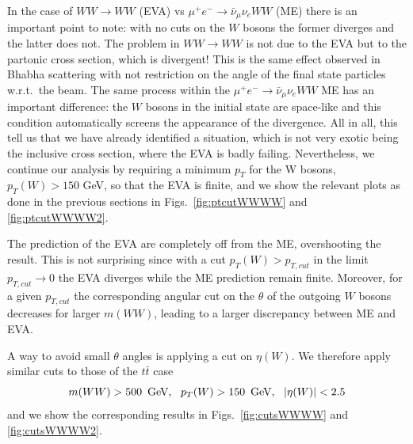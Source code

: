 \documentclass[a4paper,11pt]{article}
\begin{document}
In the case of $WW \to WW$ (EVA) vs $\mu^+e^-\to\bar \nu_\mu \nu_e WW$ (ME) there is an important point to note: with no cuts on the $W$ bosons the former diverges and the latter does not. The problem in $WW\to WW$ is not due to the EVA but to the partonic cross section, which is divergent! This is the same effect observed in Bhabha scattering with not restriction on the angle of the final state particles w.r.t.~the beam. The same process within the $\mu^+e^-\to\bar \nu_\mu \nu_e WW$ ME has an important difference: the $W$ bosons in the initial state are space-like and this condition automatically screens the appearance of the divergence. All in all, this tell us that we have already identified a situation, which is not very exotic being the inclusive cross section, where the EVA is badly failing. Nevertheless, we continue our analysis by requiring a minimum $p_T$ for the W bosons, $p_T(W)>150$ GeV, so that the EVA is finite, and we show the relevant plots as done in the previous sections in Figs.~\ref{fig:ptcutWWWW} and \ref{fig:ptcutWWWW2}. 

The prediction of the EVA are completely off from the ME, overshooting the result. This is not surprising since with a cut  $p_T(W)>p_{T,cut}$ in the limit $p_{T,cut}\to 0$ the EVA diverges while the ME prediction remain finite. Moreover, for a given $p_{T,cut}$ the corresponding angular cut on the $\theta$ of the outgoing $W$ bosons decreases for larger $m(WW)$, leading to a larger discrepancy between ME and EVA. 

A way to avoid small $\theta$ angles is applying a cut on $\eta(W)$. We therefore apply similar cuts to those of the $t \bar t$ case 
%
\begin{equation}
m(WW) > 500~\,\textrm{GeV}, ~~p_T(W) > 150~\,\textrm{GeV},~~ |\eta(W)|<2.5 
\end{equation}
 and we show the corresponding results in Figs.~\ref{fig:cutsWWWW} and \ref{fig:cutsWWWW2}.
\end{document}
